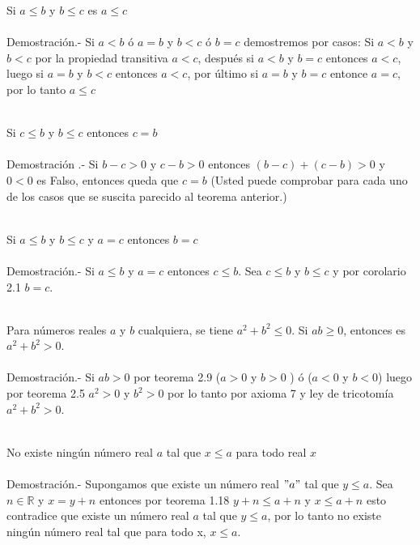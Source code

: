 \begin{teo}
Si $a \leq b $ y $b \leq c$ es $a\leq c$\\\\
Demostración.- \; Si $a<b$ ó $a=b$ y $b<c$ ó $b=c$ demostremos por casos: Si $a<b$ y $b<c$ por la propiedad transitiva $a<c$, después si $a<b$ y $b=c$ entonces $a<c$, luego si $a=b$ y $b<c$ entonces $a<c$,  por último si $a=b$ y $b=c$ entonce $a=c$, por lo tanto $a\leq c$\\\\
\end{teo}

\begin{col.}
Si $c\leq b$ y $b \leq c$ entonces $c=b$\\\\
Demostración .- \; Si $b-c>0$ y $c-b>0$ entonces $(b-c)+(c-b)>0$ y $0<0$ es Falso, entonces queda que $c=b$ (Usted puede comprobar para cada uno de los casos que se suscita parecido al teorema anterior.)\\\\
\end{col.}

\begin{teo}
Si $a\leq b$ y $b \leq c$ y $a=c$ entonces $b=c$\\\\
Demostración.- \; Si $a\leq b$\;  y \; $a=c$ entonces $c\leq b$. Sea $c\leq b$ \; y \; $b\leq c$ y por corolario 2.1 \; $b=c$.\\\\
\end{teo}

\begin{teo}
Para números reales $a$ y $b$ cualquiera, se tiene $a^2+b^2\leq 0$. Si $ab\geq 0$, entonces es $a^2+b^2>0$.\\\\
Demostración.- \; Si $ab>0$ por teorema 2.9 ($a>0$ y $b>0$ ) ó ($a<0$ y $b<0$) luego por teorema 2.5 $a^2>0$ y $b^2>0$ por lo tanto por axioma 7 y ley de tricotomía $a^2+b^2>0$.\\\\ 
\end{teo}

\begin{teo}
No existe ningún número real $a$ tal que $x\leq a$ para todo real $x$\\\\
Demostración.- \; Supongamos que existe un número real $" a "$ tal que $y \leq a$. Sea $n\in \mathbb{R}$ \; y \; $x=y+n$ entonces por teorema 1.18 \; $y+n \leq a+n$ \; y \; $x\leq a+n$ esto contradice que existe un número real $a$ tal que $y\leq a$, por lo tanto no existe ningún número real tal que para todo x, $x\leq a$.\\\\
\end{teo}

